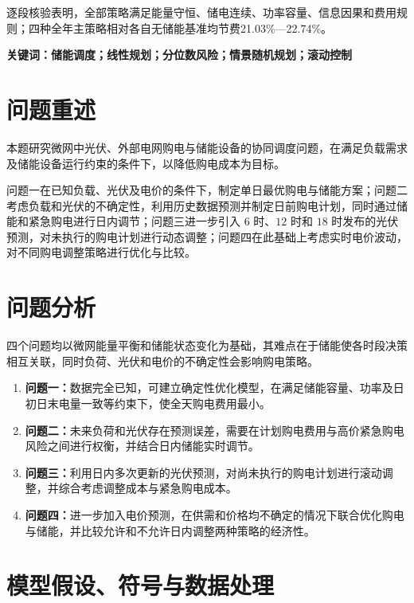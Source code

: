 \documentclass[UTF8,fontset=none,12pt,a4paper]{ctexart}
\begin{document}
逐段核验表明，全部策略满足能量守恒、储电连续、功率容量、信息因果和费用规则；四种全年主策略相对各自无储能基准均节费21.03\%—22.74\%。

\noindent\textbf{关键词：}\textbf{储能调度；线性规划；分位数风险；情景随机规划；滚动控制}
\endgroup
\clearpage

\section{问题重述}
本题研究微网中光伏、外部电网购电与储能设备的协同调度问题，在满足负载需求及储能设备运行约束的条件下，以降低购电成本为目标。

问题一在已知负载、光伏及电价的条件下，制定单日最优购电与储能方案；问题二考虑负载和光伏的不确定性，利用历史数据预测并制定日前购电计划，同时通过储能和紧急购电进行日内调节；问题三进一步引入 $6$ 时、$12$ 时和 $18$ 时发布的光伏预测，对未执行的购电计划进行动态调整；问题四在此基础上考虑实时电价波动，对不同购电调整策略进行优化与比较。

\section{问题分析}
四个问题均以微网能量平衡和储能状态变化为基础，其难点在于储能使各时段决策相互关联，同时负荷、光伏和电价的不确定性会影响购电策略。

\begin{enumerate}
    \item \textbf{问题一：}数据完全已知，可建立确定性优化模型，在满足储能容量、功率及日初日末电量一致等约束下，使全天购电费用最小。

    \item \textbf{问题二：}未来负荷和光伏存在预测误差，需要在计划购电费用与高价紧急购电风险之间进行权衡，并结合日内储能实时调节。

    \item \textbf{问题三：}利用日内多次更新的光伏预测，对尚未执行的购电计划进行滚动调整，并综合考虑调整成本与紧急购电成本。

    \item \textbf{问题四：}进一步加入电价预测，在供需和价格均不确定的情况下联合优化购电与储能，并比较允许和不允许日内调整两种策略的经济性。
\end{enumerate}

\section{模型假设、符号与数据处理}
\end{document}
